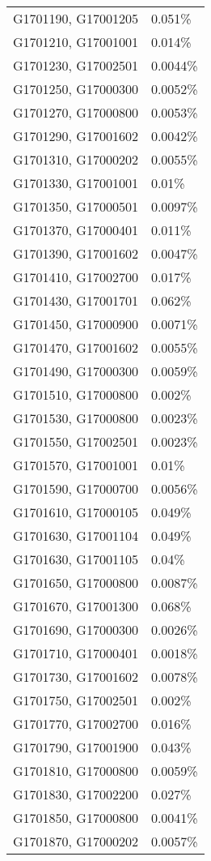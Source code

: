 \begin{longtable}[]{@{}ll@{}}
G1701190, G17001205 & 0.051\% \\
G1701210, G17001001 & 0.014\% \\
G1701230, G17002501 & 0.0044\% \\
G1701250, G17000300 & 0.0052\% \\
G1701270, G17000800 & 0.0053\% \\
G1701290, G17001602 & 0.0042\% \\
G1701310, G17000202 & 0.0055\% \\
G1701330, G17001001 & 0.01\% \\
G1701350, G17000501 & 0.0097\% \\
G1701370, G17000401 & 0.011\% \\
G1701390, G17001602 & 0.0047\% \\
G1701410, G17002700 & 0.017\% \\
G1701430, G17001701 & 0.062\% \\
G1701450, G17000900 & 0.0071\% \\
G1701470, G17001602 & 0.0055\% \\
G1701490, G17000300 & 0.0059\% \\
G1701510, G17000800 & 0.002\% \\
G1701530, G17000800 & 0.0023\% \\
G1701550, G17002501 & 0.0023\% \\
G1701570, G17001001 & 0.01\% \\
G1701590, G17000700 & 0.0056\% \\
G1701610, G17000105 & 0.049\% \\
G1701630, G17001104 & 0.049\% \\
G1701630, G17001105 & 0.04\% \\
G1701650, G17000800 & 0.0087\% \\
G1701670, G17001300 & 0.068\% \\
G1701690, G17000300 & 0.0026\% \\
G1701710, G17000401 & 0.0018\% \\
G1701730, G17001602 & 0.0078\% \\
G1701750, G17002501 & 0.002\% \\
G1701770, G17002700 & 0.016\% \\
G1701790, G17001900 & 0.043\% \\
G1701810, G17000800 & 0.0059\% \\
G1701830, G17002200 & 0.027\% \\
G1701850, G17000800 & 0.0041\% \\
G1701870, G17000202 & 0.0057\% \\

\end{longtable}
